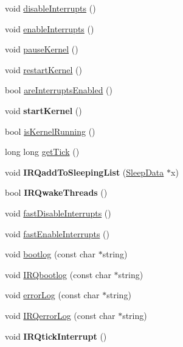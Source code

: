 \begin{DoxyCompactItemize}
\item 
void \hyperlink{group___kernel_gacd7ef6e968c5c0b2ff45bf102388ea4d}{disable\-Interrupts} ()
\item 
void \hyperlink{group___kernel_ga36adaaa176d004747d2a01b822c9fea5}{enable\-Interrupts} ()
\item 
void \hyperlink{group___kernel_ga730c9359f8069cb2f785501ea763eb43}{pause\-Kernel} ()
\item 
void \hyperlink{group___kernel_gad3bee49a8dd57a598b7d7aeeeaf8496c}{restart\-Kernel} ()
\item 
bool \hyperlink{group___kernel_gacabb0637ded36778470fa27eea329d84}{are\-Interrupts\-Enabled} ()
\item 
\hypertarget{group___kernel_ga0cad893a4c93263581e34dd3e0141649}{void {\bfseries start\-Kernel} ()}\label{group___kernel_ga0cad893a4c93263581e34dd3e0141649}

\item 
bool \hyperlink{group___kernel_gaabdbf06e8cf514d3113325a01927ccf5}{is\-Kernel\-Running} ()
\item 
long long \hyperlink{group___kernel_gad16c495ced6659e8bc0bb371362674ef}{get\-Tick} ()
\item 
\hypertarget{namespacemiosix_ad70f5b2b61a1820c6b5c57082e22fde3}{void {\bfseries I\-R\-Qadd\-To\-Sleeping\-List} (\hyperlink{structmiosix_1_1_sleep_data}{Sleep\-Data} $\ast$x)}\label{namespacemiosix_ad70f5b2b61a1820c6b5c57082e22fde3}

\item 
\hypertarget{namespacemiosix_abac7326f5486554eb4b205388af5bcdd}{bool {\bfseries I\-R\-Qwake\-Threads} ()}\label{namespacemiosix_abac7326f5486554eb4b205388af5bcdd}

\item 
void \hyperlink{group___kernel_gaeeacb47660439066bb1d787593da9f4e}{fast\-Disable\-Interrupts} ()
\item 
void \hyperlink{group___kernel_ga882229b6c936a87454cb154a90751927}{fast\-Enable\-Interrupts} ()
\item 
void \hyperlink{namespacemiosix_a0e2bf0d427fe1eb214692830e46fb209}{bootlog} (const char $\ast$string)
\item 
void \hyperlink{namespacemiosix_a77703dfc8874c826975fa54f79e7a3e5}{I\-R\-Qbootlog} (const char $\ast$string)
\item 
void \hyperlink{namespacemiosix_ac57cb5a3e83dc0c859161bc4aa04d591}{error\-Log} (const char $\ast$string)
\item 
void \hyperlink{namespacemiosix_afa3e31f3fb49abc777a10380ca9ffe19}{I\-R\-Qerror\-Log} (const char $\ast$string)
\item 
\hypertarget{namespacemiosix_aa378d1adaae88a5ebd03183e268949bd}{void {\bfseries I\-R\-Qtick\-Interrupt} ()}\label{namespacemiosix_aa378d1adaae88a5ebd03183e268949bd}


\end{DoxyCompactItemize}
